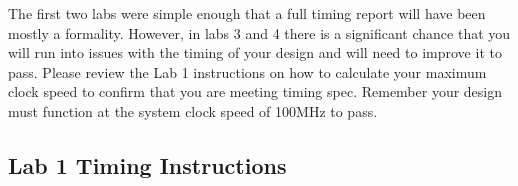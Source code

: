 The first two labs were simple enough that a full timing report will have been mostly a formality. However, in labs 3 and 4 there is a significant chance that you will run into issues with the timing of your design and will need to improve it to pass. Please review the Lab 1 instructions on how to calculate your maximum clock speed to confirm that you are meeting timing spec. Remember your design must function at the system clock speed of 100MHz to pass. 

\vspace{0.5cm}
\subsection{Lab 1 Timing Instructions}
